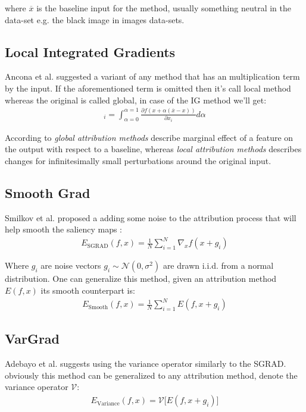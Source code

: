 \documentclass[12pt]{report}
\begin{document}
where $\overline{x}$ is the baseline input for the method, usually something neutral in the data-set e.g. the black image in images data-sets.

\subsection{Local Integrated Gradients}
Ancona et al. \cite{https://doi.org/10.48550/arxiv.1711.06104} suggested a variant of any method that has an multiplication term by the input. If the aforementioned term is omitted then it's call local method whereas the original is called global, in case of the IG method we'll get:
\begin{align*}
	[E_\text{local-IG}(f, x)]_i  = \int_{\alpha=0}^{\alpha=1}\frac{\partial f(x+ \alpha(\overline{x}-x ))}{\partial x_i} d \alpha
\end{align*}

According to \cite{https://doi.org/10.48550/arxiv.1711.06104} \textit{global attribution methods} describe  marginal effect of a feature on the output
with respect to a baseline, whereas  \textit{local attribution methods} describes changes for infinitesimally small perturbations around the original input.\\

\subsection{Smooth Grad}

Smilkov et al. \cite{DBLP:journals/corr/SmilkovTKVW17} proposed a adding some noise to the attribution process that will help smooth the saliency maps :
\begin{align*}
	E_\text{SGRAD}(f, x)  = \frac{1}{N}\sum_{i=1}^{N}\nabla_{x}f(x+g_i)
\end{align*}

Where $g_i$ are noise vectors $g_i \sim \mathcal{N}(0, \sigma^2) $ are drawn i.i.d. from a normal distribution. One can generalize this method, given an attribution method $E(f, x)$ its smooth counterpart is:
\begin{align*}
	E_\text{Smooth}(f, x)  = \frac{1}{N}\sum_{i=1}^{N}E(f, x + g_i)
\end{align*}


\subsection{VarGrad}
Adebayo et al. \cite{DBLP:journals/corr/abs-1810-03307} suggests using the variance operator similarly to the SGRAD. obviously this method can be generalized to any attribution method, denote the variance operator $\mathcal{V}$:
\begin{align*}
	E_\text{Variance}(f, x)  = \mathcal{V} \big[E(f, x + g_i)\big]
\end{align*}
\end{document}
